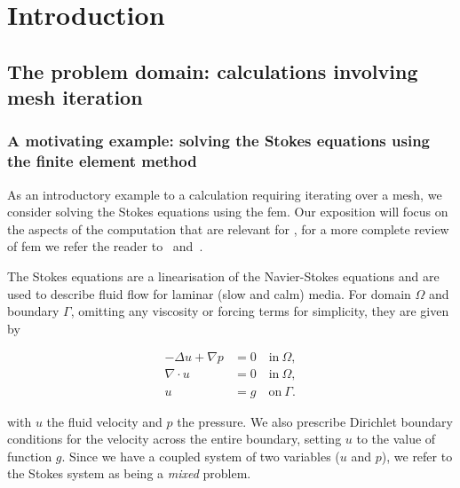 \documentclass[thesis]{subfiles}
\begin{document}
\chapter{Introduction}
\label{chapter:introduction}



\section{The problem domain: calculations involving mesh iteration}

\subsection{A motivating example: solving the Stokes equations using the finite element method}

As an introductory example to a calculation requiring iterating over a mesh, we consider solving the Stokes equations using the \gls{fem}.
Our exposition will focus on the aspects of the computation that are relevant for , for a more complete review of \gls{fem} we refer the reader to~\cite{brennerMathematicalTheoryFinite2008} and~\cite{larsonFiniteElementMethod2013}.

The Stokes equations are a linearisation of the Navier-Stokes equations and are used to describe fluid flow for laminar (slow and calm) media.
For domain $\Omega$ and boundary $\Gamma$, omitting any viscosity or forcing terms for simplicity, they are given by

\begin{subequations}
  \begin{align}
    - \Delta u + \nabla p &= 0 \quad \textrm{in} \ \Omega, \\
    \nabla \cdot u &= 0 \quad \textrm{in} \ \Omega, \\
    u &= g \quad \textrm{on} \ \Gamma.
  \end{align}
  \label{eq:strong_stokes}
\end{subequations}

with $u$ the fluid velocity and $p$ the pressure.
We also prescribe Dirichlet boundary conditions for the velocity across the entire boundary, setting $u$ to the value of function $g$.
Since we have a coupled system of two variables ($u$ and $p$), we refer to the Stokes system as being a \textit{mixed} problem.
\end{document}
